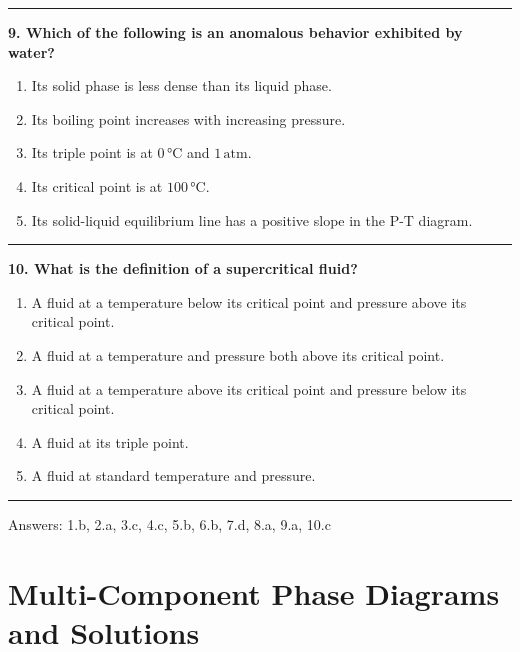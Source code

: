 \documentclass[
  9pt,
]{extbook}
\providecommand{\tightlist}{%
  \setlength{\itemsep}{0pt}\setlength{\parskip}{0pt}}
\theoremstyle{definition}
\theoremstyle{definition}
\theoremstyle{definition}
\theoremstyle{definition}
\theoremstyle{remark}
\begin{document}
\begin{center}\rule{0.5\linewidth}{0.5pt}\end{center}

\textbf{9. Which of the following is an anomalous behavior exhibited by water?}

\begin{enumerate}
\def\labelenumi{\alph{enumi}.}
\tightlist
\item
  Its solid phase is less dense than its liquid phase.
\item
  Its boiling point increases with increasing pressure.
\item
  Its triple point is at \(0\,\text{°C}\) and \(1\,\text{atm}\).
\item
  Its critical point is at \(100\,\text{°C}\).
\item
  Its solid-liquid equilibrium line has a positive slope in the P-T diagram.
\end{enumerate}

\begin{center}\rule{0.5\linewidth}{0.5pt}\end{center}

\textbf{10. What is the definition of a supercritical fluid?}

\begin{enumerate}
\def\labelenumi{\alph{enumi}.}
\tightlist
\item
  A fluid at a temperature below its critical point and pressure above its critical point.
\item
  A fluid at a temperature and pressure both above its critical point.
\item
  A fluid at a temperature above its critical point and pressure below its critical point.
\item
  A fluid at its triple point.
\item
  A fluid at standard temperature and pressure.
\end{enumerate}

\begin{center}\rule{0.5\linewidth}{0.5pt}\end{center}

Answers: 1.b, 2.a, 3.c, 4.c, 5.b, 6.b, 7.d, 8.a, 9.a, 10.c

\renewcommand*{\standardstate}{{-\kern-6pt{\ominus}\kern-6pt-}}

\chapter{Multi-Component Phase Diagrams and Solutions}\label{MCPhaseDiagrams}
\end{document}
